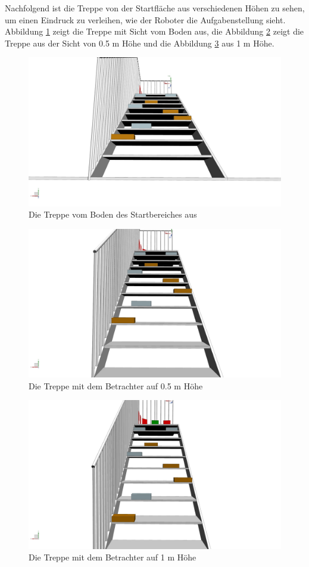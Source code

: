 Nachfolgend ist die Treppe von der Startfläche aus verschiedenen Höhen zu sehen, um einen Eindruck zu verleihen, wie der Roboter die Aufgabenstellung sieht. Abbildung \ref{fig:treppe-aufriss-boden} zeigt die Treppe mit Sicht vom Boden aus, die Abbildung \ref{fig:treppe-aufriss-0.5m} zeigt die Treppe aus der Sicht von 0.5 m Höhe und die Abbildung \ref{fig:treppe-aufriss-1m} aus 1 m Höhe.

\begin{figure}[H]
  \includegraphics[width=1\textwidth]{img/Boden.png}
  \centering
  \caption{Die Treppe vom Boden des Startbereiches aus}
  \label{fig:treppe-aufriss-boden}
\end{figure}

\newpage

\begin{figure}[H]
  \includegraphics[width=1\textwidth]{img/500mm.png}
  \centering
  \caption{Die Treppe mit dem Betrachter auf 0.5 m Höhe}
  \label{fig:treppe-aufriss-0.5m}
\end{figure}

\begin{figure}[H]
  \includegraphics[width=1\textwidth]{img/1000mm.png}
  \centering
  \caption{Die Treppe mit dem Betrachter auf 1 m Höhe}
  \label{fig:treppe-aufriss-1m}
\end{figure}

